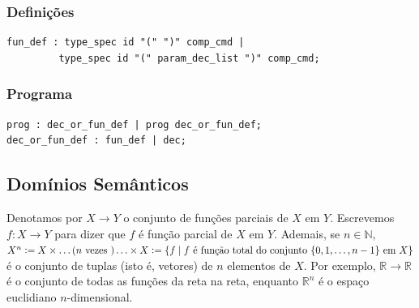 \documentclass[12pt]{article}
\newcommand{\defeq}{\vcentcolon=}
\begin{document}
\subsubsection{Definições}

\begin{verbatim}
fun_def : type_spec id "(" ")" comp_cmd |
         type_spec id "(" param_dec_list ")" comp_cmd;
\end{verbatim}

\subsubsection{Programa}

\begin{verbatim}
prog : dec_or_fun_def | prog dec_or_fun_def;
dec_or_fun_def : fun_def | dec;
\end{verbatim}

\subsection{Domínios Semânticos}

Denotamos por $X \rightarrow Y$ o conjunto de funções parciais de $X$ em $Y$. Escrevemos $f:X \rightarrow Y$ para dizer que $f$ é função parcial de $X$ em $Y$. Ademais, se $n\in\mathbb{N}$, $X^n \defeq X \times \ldots (n \text{ vezes }) \ldots \times X \defeq \{f \mid f \text{ é função total do conjunto } \{0, 1, \ldots, n-1\}\text{ em } X\}$ é o conjunto de tuplas (isto é, vetores) de $n$ elementos de $X$. Por exemplo, $\mathbb{R}\to\mathbb{R}$ é o conjunto de todas as funções da reta na reta, enquanto $\mathbb{R}^n$ é o espaço euclidiano $n$-dimensional.
\end{document}
